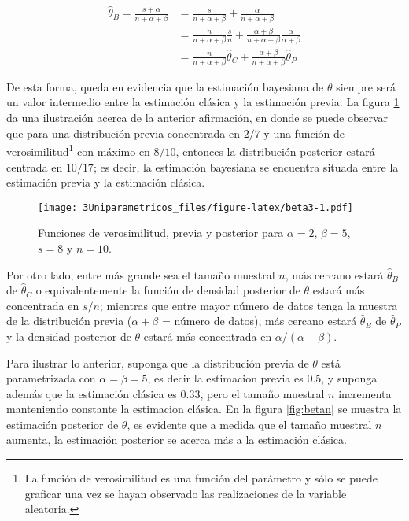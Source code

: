 \documentclass[
  10pt,
  spanish,
]{book}
\theoremstyle{definition}
\theoremstyle{definition}
\theoremstyle{definition}
\theoremstyle{definition}
\theoremstyle{remark}
\begin{document}
\begin{align*}
\hat{\theta}_{B}=\frac{s+\alpha}{n+\alpha+\beta}&=\frac{s}{n+\alpha+\beta}+\frac{\alpha}{n+\alpha+\beta}\\
&=\frac{n}{n+\alpha+\beta}\frac{s}{n}+\frac{\alpha+\beta}{n+\alpha+\beta}\frac{\alpha}{\alpha+\beta}\\
&=\frac{n}{n+\alpha+\beta}\hat{\theta}_{C}+\frac{\alpha+\beta}{n+\alpha+\beta}\hat{\theta}_{P}
\end{align*}

De esta forma, queda en evidencia que la estimación bayesiana de
\(\theta\) siempre será un valor intermedio entre la estimación clásica y
la estimación previa. La figura \ref{fig:beta3} da una ilustración
acerca de la anterior afirmación, en donde se puede observar que para
una distribución previa concentrada en \(2/7\) y una función de
verosimilitud\footnote{La función de verosimilitud es una función del parámetro
  y sólo se puede graficar una vez se hayan observado las realizaciones de
  la variable aleatoria.} con máximo en \(8/10\), entonces la distribución
posterior estará centrada en \(10/17\); es decir, la estimación bayesiana
se encuentra situada entre la estimación previa y la estimación clásica.

\begin{figure}
\centering
\texttt{[image: 3Uniparametricos\_files/figure-latex/beta3-1.pdf]}
\caption{\label{fig:beta3}Funciones de verosimilitud, previa y posterior para \(\alpha=2\), \(\beta=5\), \(s=8\) y \(n=10\).}
\end{figure}

Por otro lado, entre más grande sea el tamaño muestral \(n\), más
cercano estará \(\hat{\theta}_{B}\) de \(\hat{\theta}_{C}\) o
equivalentemente la función de densidad posterior de \(\theta\) estará más
concentrada en \(s/n\); mientras que entre mayor número de datos tenga la
muestra de la distribución previa (\(\alpha+\beta\) = número de datos), más
cercano estará \(\hat{\theta}_{B}\) de \(\hat{\theta}_{P}\) y la densidad
posterior de \(\theta\) estará más concentrada en \(\alpha/(\alpha+\beta)\).

Para ilustrar lo anterior, suponga que la distribución previa de
\(\theta\) está parametrizada con \(\alpha=\beta=5\), es decir la estimacion previa es 0.5, y suponga además que la estimación clásica es 0.33, pero el tamaño muestral \(n\) incrementa manteniendo constante la estimacion
clásica. En la figura \ref{fig:betan} se muestra la estimación posterior de
\(\theta\), es evidente que a medida que el tamaño muestral \(n\) aumenta,
la estimación posterior se acerca más a la estimación clásica.
\end{document}
